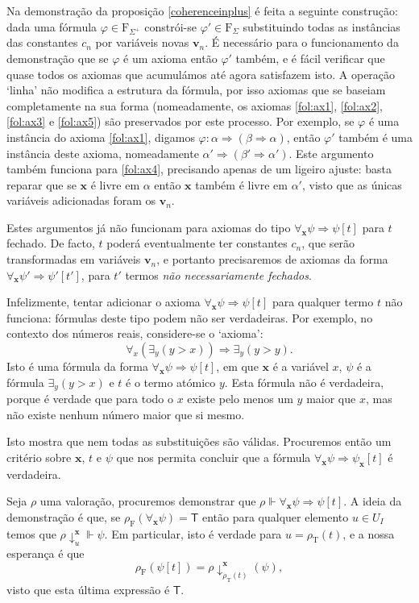 \documentclass{report}
\theoremstyle{definition}
\theoremstyle{remark}
\renewcommand{\bf}[1]{\mathbf{#1}}
\newcommand{\F}{\mathrm{F}}
\newcommand{\T}{\mathrm{T}}
\newcommand{\lt}{\mathsf{T}}
\newcommand{\imply}{\mathbin{\Rightarrow}}
\begin{document}
	Na demonstração da proposição \ref{coherenceinplus} é feita a seguinte construção: dada uma fórmula $\varphi \in \F_{\Sigma^+}$ constrói-se $\varphi' \in \F_\Sigma$ substituindo todas as instâncias das constantes $c_n$ por variáveis novas $\bf v_n$. É necessário para o funcionamento da demonstração que se $\varphi$ é um axioma então $\varphi'$ também, e é fácil verificar que quase todos os axiomas que acumulámos até agora satisfazem isto. A operação `linha' não modifica a estrutura da fórmula, por isso axiomas que se baseiam completamente na sua forma (nomeadamente, os axiomas \eqref{fol:ax1}, \eqref{fol:ax2}, \eqref{fol:ax3} e \eqref{fol:ax5}) são preservados por este processo. Por exemplo, se $\varphi$ é uma instância do axioma \eqref{fol:ax1}, digamos $\varphi : \alpha \imply (\beta \imply \alpha)$, então $\varphi'$ também é uma instância deste axioma, nomeadamente $\alpha' \imply (\beta' \imply \alpha')$. Este argumento também funciona para \eqref{fol:ax4}, precisando apenas de um ligeiro ajuste: basta reparar que se $\bf x$ é livre em $\alpha$ então $\bf x$ também é livre em $\alpha'$, visto que as únicas variáveis adicionadas foram os $\bf v_n$.

	Estes argumentos já não funcionam para axiomas do tipo $\forall_{\bf x} \psi \imply \psi[t]$ para $t$ fechado. De facto, $t$ poderá eventualmente ter constantes $c_n$, que serão transformadas em variáveis $\bf v_n$, e portanto precisaremos de axiomas da forma $\forall_{\bf x} \psi' \imply \psi'[t']$, para $t'$ termos \emph{não necessariamente fechados}.

	Infelizmente, tentar adicionar o axioma $\forall_{\bf x} \psi \imply \psi[t]$ para qualquer termo $t$ não funciona: fórmulas deste tipo podem não ser verdadeiras. Por exemplo, no contexto dos números reais, considere-se o `axioma':
\[\forall_x (\exists_y (y>x)) \imply \exists_y (y > y).\]
Isto é uma fórmula da forma $\forall_{\bf x} \psi \imply \psi[t]$, em que $\bf x$ é a variável $x$, $\psi$ é a fórmula $\exists_y (y>x)$ e $t$ é o termo atómico $y$. Esta fórmula não é verdadeira, porque é verdade que para todo o $x$ existe pelo menos um $y$ maior que $x$, mas não existe nenhum número maior que si mesmo.

	Isto mostra que nem todas as substituições são válidas. Procuremos então um critério sobre $\bf x$, $t$ e $\psi$ que nos permita concluir que a fórmula $\forall_{\bf x} \psi \imply \psi_{\bf x}[t]$ é verdadeira.

	Seja $\rho$ uma valoração, procuremos demonstrar que $\rho \Vdash \forall_{\bf x} \psi \imply \psi[t]$. A ideia da demonstração é que, se $\rho_\F(\forall_{\bf x} \psi) = \lt$ então para qualquer elemento $u \in U_I$ temos que $\rho\!\downarrow^{\bf x}_u \Vdash \psi$. Em particular, isto é verdade para $u = \rho_\T(t)$, e a nossa esperança é que
\begin{equation}\label{hope}
\rho_\F(\psi[t]) = \rho\!\downarrow^{\bf x}_{\rho_\T(t)}(\psi),
\end{equation}
visto que esta última expressão é $\lt$.
\end{document}
